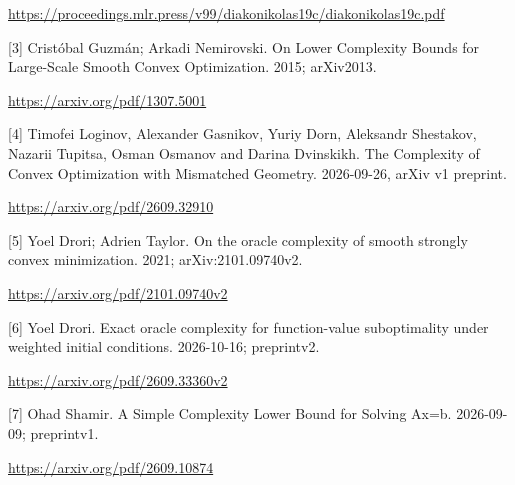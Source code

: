 \documentclass[10pt,a4paper]{article}
\begin{document}
\url{https://proceedings.mlr.press/v99/diakonikolas19c/diakonikolas19c.pdf}

[3] Cristóbal Guzmán; Arkadi Nemirovski. On Lower Complexity Bounds for Large-Scale Smooth Convex Optimization. 2015; arXiv2013.

\url{https://arxiv.org/pdf/1307.5001}

[4] Timofei Loginov, Alexander Gasnikov, Yuriy Dorn, Aleksandr Shestakov, Nazarii Tupitsa, Osman Osmanov and Darina Dvinskikh. The Complexity of Convex Optimization with Mismatched Geometry. 2026-09-26, arXiv v1 preprint.

\url{https://arxiv.org/pdf/2609.32910}

[5] Yoel Drori; Adrien Taylor. On the oracle complexity of smooth strongly convex minimization. 2021; arXiv:2101.09740v2.

\url{https://arxiv.org/pdf/2101.09740v2}

[6] Yoel Drori. Exact oracle complexity for function-value suboptimality under weighted initial conditions. 2026-10-16; preprintv2.

\url{https://arxiv.org/pdf/2609.33360v2}

[7] Ohad Shamir. A Simple Complexity Lower Bound for Solving Ax=b. 2026-09-09; preprintv1.

\url{https://arxiv.org/pdf/2609.10874}
\end{document}
